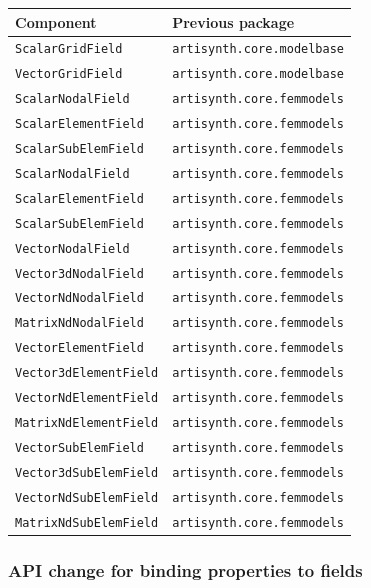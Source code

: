 \documentclass{article}
\begin{document}
\begin{tabular}{|ll|}
\hline
Component & Previous package\\
\hline
{\tt ScalarGridField} & {\tt artisynth.core.modelbase} \\
{\tt VectorGridField} & {\tt artisynth.core.modelbase} \\
{\tt ScalarNodalField} & {\tt artisynth.core.femmodels} \\
{\tt ScalarElementField} & {\tt artisynth.core.femmodels} \\
{\tt ScalarSubElemField} & {\tt artisynth.core.femmodels} \\
{\tt ScalarNodalField} & {\tt artisynth.core.femmodels} \\
{\tt ScalarElementField} & {\tt artisynth.core.femmodels} \\
{\tt ScalarSubElemField} & {\tt artisynth.core.femmodels} \\
{\tt VectorNodalField} & {\tt artisynth.core.femmodels} \\
{\tt Vector3dNodalField} & {\tt artisynth.core.femmodels} \\
{\tt VectorNdNodalField} & {\tt artisynth.core.femmodels} \\
{\tt MatrixNdNodalField} & {\tt artisynth.core.femmodels} \\
{\tt VectorElementField} & {\tt artisynth.core.femmodels} \\
{\tt Vector3dElementField} & {\tt artisynth.core.femmodels} \\
{\tt VectorNdElementField} & {\tt artisynth.core.femmodels} \\
{\tt MatrixNdElementField} & {\tt artisynth.core.femmodels} \\
{\tt VectorSubElemField} & {\tt artisynth.core.femmodels} \\
{\tt Vector3dSubElemField} & {\tt artisynth.core.femmodels} \\
{\tt VectorNdSubElemField} & {\tt artisynth.core.femmodels} \\
{\tt MatrixNdSubElemField} & {\tt artisynth.core.femmodels}
\end{tabular}

\subsubsection{API change for binding properties to fields}
\end{document}
